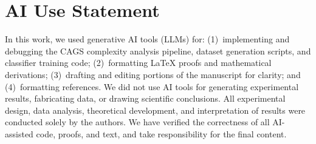 \section{AI Use Statement}
\label{sec:ai-use}

In this work, we used generative AI tools (LLMs) for: (1)~implementing and debugging the CAGS complexity analysis pipeline, dataset generation scripts, and classifier training code; (2)~formatting LaTeX proofs and mathematical derivations; (3)~drafting and editing portions of the manuscript for clarity; and (4)~formatting references. We did not use AI tools for generating experimental results, fabricating data, or drawing scientific conclusions. All experimental design, data analysis, theoretical development, and interpretation of results were conducted solely by the authors. We have verified the correctness of all AI-assisted code, proofs, and text, and take responsibility for the final content.
